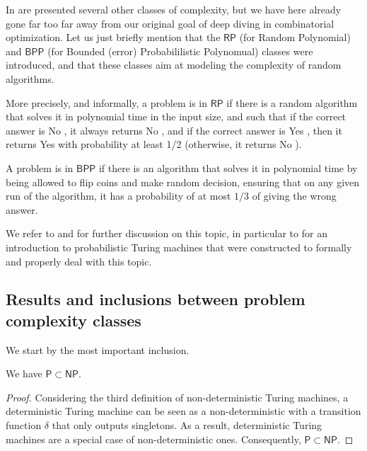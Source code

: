 \begin{remark}
    In \cite{gowers2024} are presented several other classes of complexity, but we have here already gone far too far away from our original goal of deep diving in combinatorial optimization. Let us just briefly mention that the $ \mathsf{RP} $ (for Random Polynomial) and $ \mathsf{BPP} $ (for Bounded (error) Probabililistic Polynomual) classes were introduced, and that these classes aim at modeling the complexity of random algorithms.

    More precisely, and informally, a problem is in $ \mathsf{RP} $ if there is a random algorithm that solves it in polynomial time in the input size, and such that if the correct answer is \og No \fg, it always returns \og No \fg, and if the correct answer is \og Yes \fg, then it returns \og Yes \fg with probability at least 1/2 (otherwise, it returns \og No \fg).

    A problem is in $ \mathsf{BPP} $ if there is an algorithm that solves it in polynomial time by being allowed to flip coins and make random decision, ensuring that on any given run of the algorithm, it has a probability of at most $ 1/3 $ of giving the wrong answer.

    We refer to \cite{sipser1996} and \cite{arora2009} for further discussion on this topic, in particular to \cite{wikiproba} for an introduction to probabilistic Turing machines that were constructed to formally and properly deal with this topic.
\end{remark}

\subsection{Results and inclusions between problem complexity classes}

We start by the most important inclusion.

\begin{proposition}
    We have $ \mathsf P \subset \mathsf{NP} $.
\end{proposition}

\begin{proof}
    Considering the third definition of non-deterministic Turing machines, a deterministic Turing machine can be seen as a non-deterministic with a transition function $ \delta $ that only outputs singletons. As a result, deterministic Turing machines are a special case of non-deterministic ones. Consequently, $ \mathsf P \subset \mathsf{NP} $.
\end{proof}


